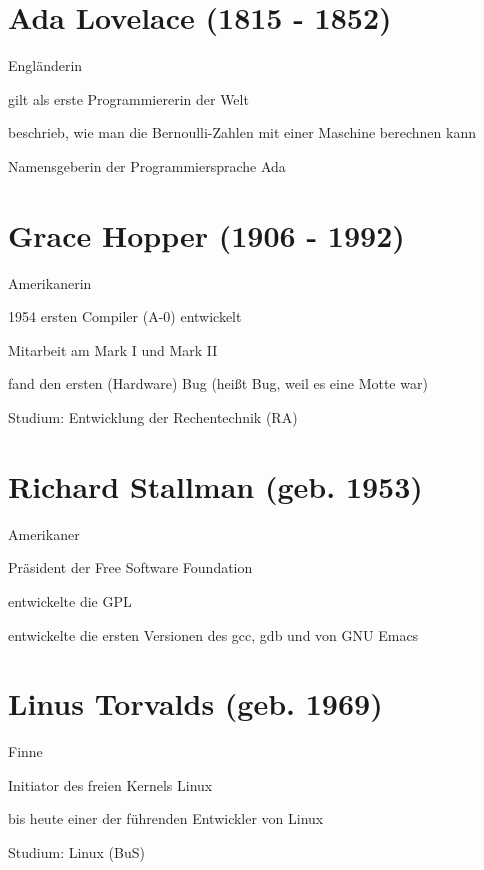 \documentclass[a4paper,12pt]{report}
\begin{document}
\section*{Ada Lovelace (1815 - 1852)}
\begin{itemize*}
	\item Engländerin
	\item gilt als erste Programmiererin der Welt
	\item beschrieb, wie man die Bernoulli-Zahlen mit einer Maschine berechnen kann
	\item Namensgeberin der Programmiersprache Ada
\end{itemize*}

\section*{Grace Hopper (1906 - 1992)}
\begin{itemize*}
	\item Amerikanerin
	\item 1954 ersten Compiler (A-0) entwickelt
	\item Mitarbeit am Mark I und Mark II
	\item fand den ersten (Hardware) Bug (heißt Bug, weil es eine Motte war)
	\item Studium: Entwicklung der Rechentechnik (RA)
\end{itemize*}

\section*{Richard Stallman (geb. 1953)}
\begin{itemize*}
	\item Amerikaner
	\item Präsident der Free Software Foundation
	\item entwickelte die GPL
	\item entwickelte die ersten Versionen des gcc, gdb und von GNU Emacs
\end{itemize*}

\section*{Linus Torvalds (geb. 1969)}
\begin{itemize*}
	\item Finne
	\item Initiator des freien Kernels Linux
	\item bis heute einer der führenden Entwickler von Linux
	\item Studium: Linux (BuS)
\end{itemize*}
\end{document}
